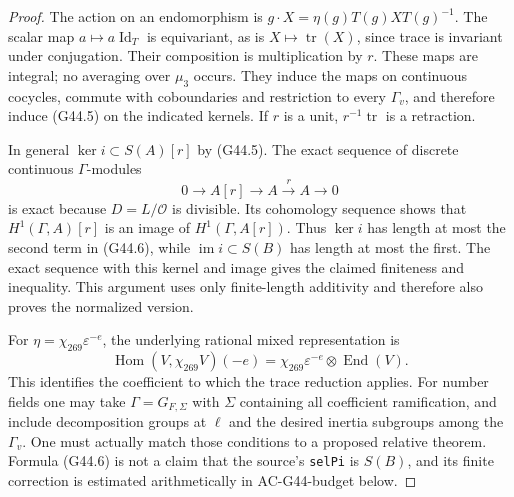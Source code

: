 \begin{proof}
The action on an endomorphism is
$g\cdot X=\eta(g)T(g)XT(g)^{-1}$.
The scalar map $a\mapsto a\operatorname{Id}_T$ is equivariant,
as is $X\mapsto\operatorname{tr}(X)$, since trace is invariant
under conjugation.  Their composition is multiplication by $r$.
These maps are integral; no averaging over $\mu_3$ occurs.
They induce the maps on continuous cocycles, commute with
coboundaries and restriction to every $\Gamma_v$, and therefore
induce (G44.5) on the indicated kernels.
If $r$ is a unit, $r^{-1}\operatorname{tr}$ is a retraction.

In general $\ker i\subset S(A)[r]$ by (G44.5).
The exact sequence of discrete continuous $\Gamma$-modules
\[
                  0\longrightarrow A[r]\longrightarrow A
                   \xrightarrow{\ r\ }A\longrightarrow0
                                                               \tag{G44.7}
\]
is exact because $D=L/\mathcal O$ is divisible.
Its cohomology sequence shows that $H^1(\Gamma,A)[r]$
is an image of $H^1(\Gamma,A[r])$.
Thus $\ker i$ has length at most the second term in (G44.6),
while $\operatorname{im}i\subset S(B)$ has length at most the
first.  The exact sequence with this kernel and image gives
the claimed finiteness and inequality.  This argument uses
only finite-length additivity and therefore also proves the
normalized version.

For $\eta=\chi_{269}\varepsilon^{-e}$, the underlying rational
mixed representation is
\[
 \operatorname{Hom}(V,\chi_{269}V)(-e)
                 =\chi_{269}\varepsilon^{-e}\otimes\operatorname{End}(V).
                                                               \tag{G44.8}
\]
This identifies the coefficient to which the trace reduction
applies.  For number fields one may take $\Gamma=G_{F,\Sigma}$
with $\Sigma$ containing all coefficient ramification, and
include decomposition groups at $\ell$ and the desired inertia
subgroups among the $\Gamma_v$.  One must actually match those
conditions to a proposed relative theorem.  Formula (G44.6)
is not a claim that the source's \texttt{selPi} is $S(B)$,
and its finite correction is estimated arithmetically in
AC-G44-budget below.
\end{proof}

